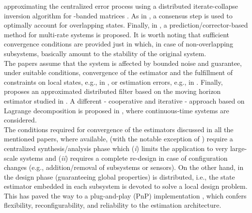 \documentclass[journal,10pt,draftcls,onecolumn]{IEEEtran}
\begin{document}
approximating the centralized error process using a distributed iterate-collapse inversion algorithm for -banded matrices \cite{KhanMouraDICI2008}. As in \cite{Vadigepalli2003,Stankovic09}, a consensus step is used to optimally account for overlapping states. Finally, in \cite{Negenborn-Kalman13}, a prediction/corrector-based method for multi-rate systems is proposed. It is worth noting that sufficient convergence conditions are provided just in \cite{Stankovic09} which, in case of non-overlapping subsystems, basically amount to the stability of the original system.\\
The papers \cite{Farina2010,Farina2011b,Riverso2013b,Riverso2013e} assume that the system is affected by bounded noise and guarantee, under suitable conditions, convergence of the estimator and the fulfillment of constraints on local states, e.g., in \cite{Farina2010}, or estimation errors, e.g., in \cite{Farina2011b,Riverso2013b,Riverso2013e}. Finally, \cite{Haber13} proposes an approximated distributed filter based on the moving horizon estimator studied in \cite{ABB03}. A different - cooperative and iterative - approach based on Lagrange decomposition is proposed in \cite{Georges20141451}, where continuous-time systems are considered.\\
The conditions required for convergence of the estimators discussed in all the mentioned papers, where available, (with the notable exception of \cite{Riverso2013e}) require a centralized synthesis/analysis phase which (\emph{i}) limits the application to very large-scale systems and (\emph{ii}) requires a complete re-design in case of configuration changes (e.g., addition/removal of subsystems or sensors). On the other hand, in \cite{Riverso2013e} the design phase (guaranteeing global properties) is distributed, i.e., the state estimator embedded in each subsystem is devoted to solve a local design problem. This has paved the way to a plug-and-play (PnP) implementation \cite{StoustrupEJC,RiversoFarinaGFT_PnP13}, which confers flexibility, reconfigurability, and reliability to the estimation architecture.\\
\end{document}
